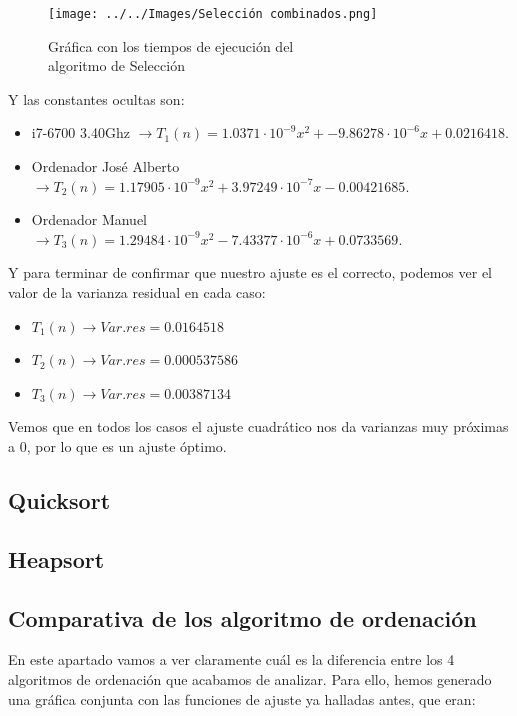 \documentclass[10pt,a4paper]{article}
\begin{document}
\begin{figure}[h!]
	\centering
	\texttt{[image: ../../Images/Selección combinados.png]}
	\caption{Gráfica con los tiempos de ejecución del \\algoritmo de Selección}
\end{figure}

Y las constantes ocultas son:
\begin{itemize}
	\item i7-6700 3.40Ghz \(\rightarrow T_1(n) = 1.0371 \cdot 10^{-9} x^2 + -9.86278 \cdot 10^{-6} x +0.0216418\).
	\item Ordenador José Alberto \(\rightarrow T_2(n) = 1.17905 \cdot 10^{-9} x^2 + 3.97249 \cdot 10^{-7} x - 0.00421685\).
	\item Ordenador Manuel \(\rightarrow T_3(n) = 1.29484 \cdot 10^{-9} x^2 - 7.43377 \cdot 10^{-6} x + 0.0733569\).
\end{itemize}

Y para terminar de confirmar que nuestro ajuste es el correcto, podemos ver el valor de la varianza residual en cada caso:

\begin{itemize}
	\item \(T_1(n) \longrightarrow Var.res = 0.0164518\)
	\item \(T_2(n) \longrightarrow Var.res = 0.000537586\)
	\item \(T_3(n) \longrightarrow Var.res = 0.00387134\)
\end{itemize}

Vemos que en todos los casos el ajuste cuadrático nos da varianzas muy próximas a 0, por lo que es un ajuste óptimo.

\subsection{Quicksort}
\subsection{Heapsort}

\subsection{Comparativa de los algoritmo de ordenación}

En este apartado vamos a ver claramente cuál es la diferencia entre los 4 algoritmos de ordenación que acabamos de analizar. Para ello, hemos generado una gráfica conjunta con las funciones de ajuste ya halladas antes, que eran:
\end{document}
